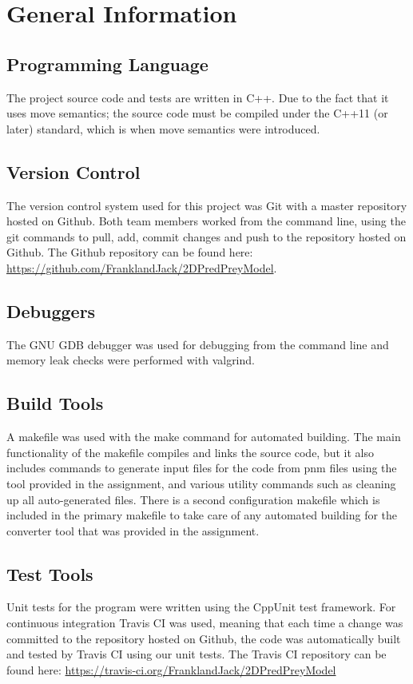 \section{General Information}
\label{sec:examples}

\subsection{Programming Language}
The project source code and tests are written in C++. Due to the fact that it uses move semantics; the source code must be compiled under the C++11 (or later) standard, which is when move semantics were introduced. 

\subsection{Version Control}
The version control system used for this project was Git with a master repository hosted on Github. Both team members worked from the command line, using the git commands to pull, add, commit changes and push to the repository hosted on Github. The Github repository can be found here: \url{https://github.com/FranklandJack/2DPredPreyModel}.

\subsection{Debuggers}
The GNU GDB debugger was used for debugging from the command line and memory leak checks were performed with valgrind. 

\subsection{Build Tools}
A makefile was used with the make command for automated building. The main functionality of the makefile compiles and links the source code, but it also includes commands to generate input files for the code from pnm files using the tool provided in the assignment, and various utility commands such as cleaning up all auto-generated files. There is a second configuration makefile which is included in the primary makefile to take care of any automated building for the converter tool that was provided in the assignment.
\subsection{Test Tools}
Unit tests for the program were written using the CppUnit test framework. For continuous integration Travis CI was used, meaning that each time a change was committed to the repository hosted on Github, the code was automatically built and tested by Travis CI using our unit tests. The Travis CI repository can be found here: \url{https://travis-ci.org/FranklandJack/2DPredPreyModel} 
